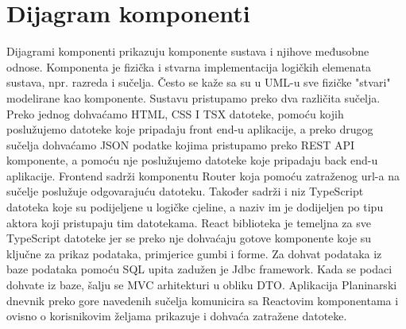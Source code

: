 			
		
			
			
			\section{Dijagram komponenti}
		Dijagrami komponenti prikazuju komponente sustava i njihove međusobne odnose. Komponenta je fizička i stvarna implementacija logičkih elemenata sustava, npr. razreda i sučelja. Često se kaže sa su u UML-u sve fizičke "stvari" modelirane kao komponente. Sustavu pristupamo preko dva različita sučelja. Preko jednog dohvaćamo HTML, CSS I TSX datoteke, pomoću kojih poslužujemo datoteke koje pripadaju front end-u aplikacije, a preko drugog sučelja dohvaćamo JSON podatke kojima pristupamo preko REST API komponente, a pomoću nje poslužujemo datoteke koje pripadaju back end-u aplikacije. Frontend sadrži komponentu Router koja pomoću zatraženog url-a na sučelje poslužuje odgovarajuću datoteku. Također sadrži i niz TypeScript datoteka koje su podijeljene u logičke cjeline, a naziv im je dodijeljen po tipu aktora koji pristupaju tim datotekama. React biblioteka je temeljna za sve TypeScript datoteke jer se preko nje dohvaćaju gotove komponente koje su ključne za prikaz podataka, primjerice gumbi i forme. Za dohvat podataka iz baze podataka pomoću SQL upita zadužen je Jdbc framework. Kada se podaci dohvate iz baze, šalju se MVC arhitekturi u obliku DTO. Aplikacija Planinarski dnevnik preko gore navedenih sučelja komunicira sa Reactovim komponentama i ovisno o korisnikovim željama prikazuje i dohvaća zatražene datoteke.
		
